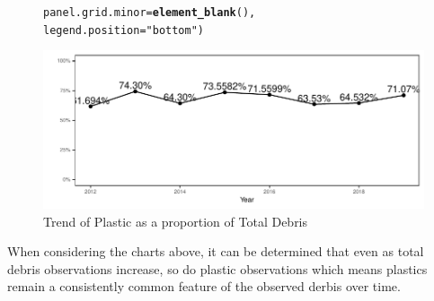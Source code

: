 \documentclass[10pt]{article}\usepackage[]{graphicx}\usepackage[]{color}
\makeatletter
\newcommand{\hlstr}[1]{\textcolor[rgb]{0.192,0.494,0.8}{#1}}%
\newcommand{\hlstd}[1]{\textcolor[rgb]{0.345,0.345,0.345}{#1}}%
\newcommand{\hlkwc}[1]{\textcolor[rgb]{0.333,0.667,0.333}{#1}}%
\newcommand{\hlkwd}[1]{\textcolor[rgb]{0.737,0.353,0.396}{\textbf{#1}}}%
\newenvironment{kframe}{%
 \def\at@end@of@kframe{}%
 \ifinner\ifhmode%
  \def\at@end@of@kframe{\end{minipage}}%
  \begin{minipage}{\columnwidth}%
 \fi\fi%
 \def\FrameCommand##1{\hskip\@totalleftmargin \hskip-\fboxsep
 \colorbox{shadecolor}{##1}\hskip-\fboxsep
     \hskip-\linewidth \hskip-\@totalleftmargin \hskip\columnwidth}%
 \MakeFramed {\advance\hsize-\width
   \@totalleftmargin\z@ \linewidth\hsize
   \@setminipage}}%
 {\par\unskip\endMakeFramed%
 \at@end@of@kframe}
\newenvironment{knitrout}{}{} %
\makeatother
\begin{document}
\begin{figure}[H]
\begin{center}
\begin{knitrout}
\begin{kframe}
\begin{alltt}
        \hlkwc{panel.grid.minor} \hlstd{=} \hlkwd{element_blank}\hlstd{(),}
        \hlkwc{legend.position} \hlstd{=} \hlstr{"bottom"}\hlstd{)}
\end{alltt}
\end{kframe}
\includegraphics[width=1\linewidth]{figure/unnamed-chunk-23-1} 

\end{knitrout}
\caption {Trend of Plastic as a proportion of Total Debris}
\label{figF}
\end {center}
\end {figure}

When considering the charts above, it can be determined that even as total debris observations increase, so do plastic observations which means plastics remain a consistently common feature of the observed derbis over time.\\
\end{document}
